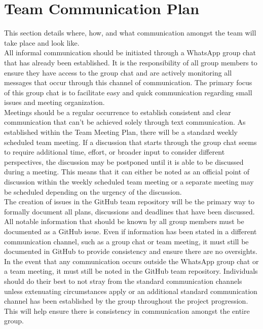 \documentclass{article}
\begin{document}
\section{Team Communication Plan}

This section details where, how, and what communication amongst the team will take place and look like.\\

All informal communication should be initiated through a WhatsApp group chat that has already been established. It
is the responsibility of all group members to ensure they have access to the group chat and are actively monitoring
all messages that occur through this channel of communication. The primary focus of this group chat is to facilitate
easy and quick communication regarding small issues and meeting organization.\\

Meetings should be a regular occurrence to establish consistent and clear communication that can’t be achieved
solely through text communication. As established within the Team Meeting Plan, there will be a standard weekly scheduled
team meeting. If a discussion that starts through the group chat seems to require additional time, effort, or
broader input to consider different perspectives, the discussion may be postponed until it is able to be discussed
during a meeting. This means that it can either be noted as an official point of discussion within the weekly
scheduled team meeting or a separate meeting may be scheduled depending on the urgency of the discussion.\\

The creation of issues in the GitHub team repository will be the primary way to formally document all plans,
discussions and deadlines that have been discussed. All notable information that should be known by all group
members must be documented as a GitHub issue. Even if information has been stated in a different communication channel,
such as a group chat or team meeting, it must still be documented in GitHub to provide consistency and ensure there
are no oversights.\\

In the event that any communication occurs outside the WhatsApp group chat or a team meeting, it must still be
noted in the GitHub team repository. Individuals should do their best to not stray from the standard communication
channels unless extenuating circumstances apply or an additional standard communication channel has been established
by the group throughout the project progression. This will help ensure there is consistency in communication amongst
the entire group.\\
\end{document}
